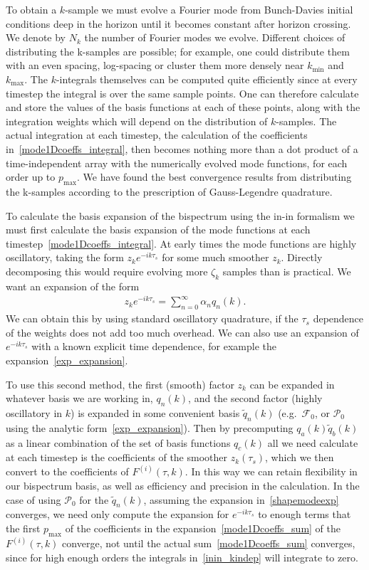 \documentclass[a4paper,12pt]{extarticle}
\newcommand{\Pmax}{p_\text{max}}
\newcommand{\Lbasic}{\mathcal{P}_0}
\newcommand{\Fbasic}{\mathcal{F}_0}
\newcommand{\kmin}{{k_\text{min}}}
\newcommand{\kmax}{{k_\text{max}}}
\begin{document}
To obtain a $k$-sample we must evolve a Fourier mode from Bunch-Davies initial conditions deep in the horizon
until it becomes constant after horizon crossing.
We denote by $N_k$ the number of Fourier modes we evolve.
Different choices of distributing the k-samples are possible; for example, one could distribute them
with an even spacing, log-spacing or cluster them more densely near $\kmin$ and $\kmax$.
The $k$-integrals themselves can be computed quite efficiently since
at every timestep the integral is over the same sample points.
One can therefore calculate and store the values of the basis functions at each of these points,
along with the integration weights which will depend on the distribution of $k$-samples.
The actual integration at each timestep, the calculation of the 
coefficients in~\eqref{mode1Dcoeffs_integral}, then becomes nothing more
than a dot product of a time-independent array with the
numerically evolved mode functions, for each order up to $\Pmax$.
We have found the best convergence results from distributing the k-samples
according to the prescription of Gauss-Legendre quadrature.


To calculate the basis expansion of the bispectrum using the in-in formalism
we must first calculate the basis expansion of the mode
functions at each timestep~\eqref{mode1Dcoeffs_integral}.
At early times the mode functions are highly oscillatory, taking the form $z_k e^{-ik\tau_s}$
for some much smoother $z_k$.
Directly decomposing this would require evolving more $\zeta_k$ samples
than is practical.
We want an expansion of the form
\begin{align}\label{mode_expansion}
	z_k e^{-ik\tau_s} = \sum_{n=0}^{\infty}\alpha_n q_n(k).
\end{align}
We can obtain this by using standard oscillatory
quadrature, if the $\tau_s$ dependence of the weights does not add too much overhead.
We can also use an expansion of $e^{-ik\tau_s}$
with a known explicit time dependence, for example
the expansion~\eqref{exp_expansion}.


To use this second method,
the first (smooth) factor $z_k$ can be expanded in whatever basis we are working in, $q_n(k)$,
and the second factor (highly oscillatory in $k$) is expanded
in some convenient basis $\tilde{q}_n(k)$
(e.g.\ $\Fbasic$, or $\Lbasic$ using the analytic form~\eqref{exp_expansion}).
Then by precomputing
$q_a(k)\tilde{q}_b(k)$
as a linear combination of the set of basis functions $q_c(k)$
all we need calculate at each timestep is the coefficients
of the smoother $z_k(\tau_s)$, which we then convert to the coefficients
of $F^{(i)}(\tau, k)$. In this way we can retain flexibility in our
bispectrum basis, as well as efficiency and precision in the calculation.
In the case of using $\Lbasic$ for the $\tilde{q}_n(k)$,
assuming the expansion in~\eqref{shapemodeexp} converges,
we need only compute the expansion for $e^{-ik\tau_s}$ to enough
terms that the first $\Pmax$ of the
coefficients in the expansion~\eqref{mode1Dcoeffs_sum} of the $F^{(i)}(\tau, k)$ converge,
not until the actual sum~\eqref{mode1Dcoeffs_sum} converges, since for high enough orders the integrals
in~\eqref{inin_kindep} will integrate to zero.
\end{document}
